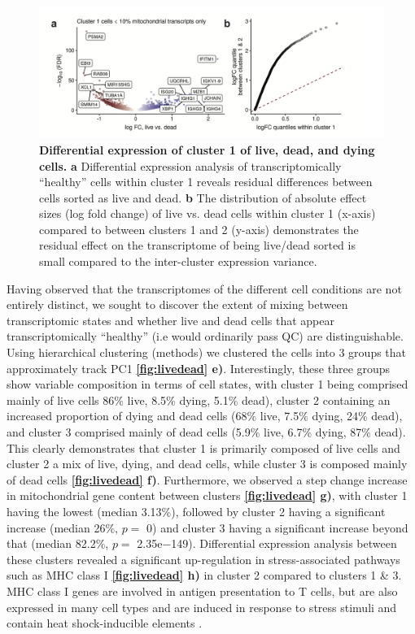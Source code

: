 \begin{figure}
	\centering
	\includegraphics[width=\textwidth]{Figures/livedead2.png}
	\caption[Differential expression of cluster 1 of live, dead, and dying cells.]
	{\small
	 \textbf{Differential expression of cluster 1 of live, dead, and dying cells.}
    \textbf{a} Differential expression analysis of transcriptomically ``healthy'' cells within cluster 1 reveals residual differences between cells sorted as live and dead.
    \textbf{b} The distribution of absolute effect sizes (log fold change) of live vs. dead cells within cluster 1 (x-axis) compared to between clusters 1 and 2 (y-axis) demonstrates the residual effect on the transcriptome of being live/dead sorted is small compared to the inter-cluster expression variance.}
	\label{fig:livedead2}

\end{figure}

Having observed that the transcriptomes of the different cell conditions are not entirely distinct, we sought to discover the extent of mixing between transcriptomic states and whether live and dead cells that appear transcriptomically ``healthy'' (i.e would ordinarily pass QC) are distinguishable. Using hierarchical clustering (methods) we clustered the cells into 3 groups  that approximately track PC1  \textbf{\autoref{fig:livedead} e)}. Interestingly, these three groups show variable composition in terms of cell states, with cluster 1 being comprised mainly of live cells 86\% live, 8.5\% dying, 5.1\% dead), cluster 2 containing an increased proportion of dying and dead cells (68\% live, 7.5\% dying, 24\% dead), and cluster 3 comprised mainly of dead cells (5.9\% live, 6.7\% dying, 87\% dead). This clearly demonstrates that cluster 1 is primarily composed of live cells and cluster 2 a mix of live, dying, and dead cells, while cluster 3 is composed mainly of dead cells  \textbf{\autoref{fig:livedead} f)}.  Furthermore, we observed a step change increase in mitochondrial gene content between clusters \textbf{\autoref{fig:livedead} g)}, with cluster 1 having the lowest (median 3.13\%), followed by cluster 2 having a significant increase (median  26\%, $p=$ 0) and cluster 3 having a significant increase beyond that (median 82.2\%, $p=$ 2.35e−149). Differential expression analysis between these clusters revealed a significant up-regulation in stress-associated pathways such as MHC class I  \textbf{\autoref{fig:livedead} h)} in cluster 2 compared to clusters 1 \& 3. MHC class I genes are involved in antigen presentation to T cells, but are also expressed in many cell types and are induced in response to stress stimuli and contain heat shock-inducible elements \cite{gleimer2003stress}. 

